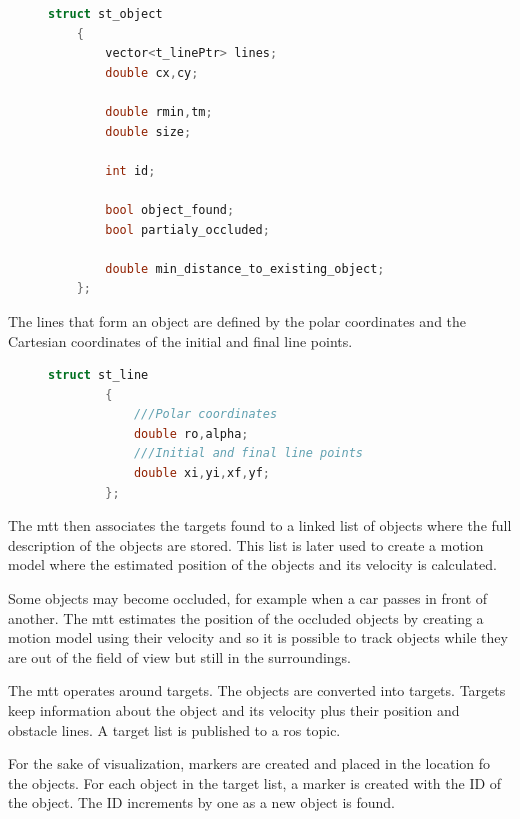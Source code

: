 \begin{figure}
\begin{center}
	\begin{lstlisting}[label={lst:stobject}, caption={st\_object struct definition},language=c++]
	struct st_object
	{
		vector<t_linePtr> lines;
		double cx,cy;
		
		double rmin,tm;
		double size;
		
		int id;
		
		bool object_found;
		bool partialy_occluded;
		
		double min_distance_to_existing_object;
	};		\end{lstlisting}
\end{center}
\end{figure}

The lines that form an object are defined by the polar coordinates and the Cartesian coordinates of the initial and final line points.

\begin{figure}
	\begin{center}
		\begin{lstlisting}[label={lst:stline}, caption={st\_line struct definition},language=c++]
		struct st_line
		{
			///Polar coordinates
			double ro,alpha;
			///Initial and final line points
			double xi,yi,xf,yf;
		};		\end{lstlisting}
	\end{center}
\end{figure}


The \gls{mtt} then associates the targets found to a linked list of objects where the full description of the objects are stored. This list is later used to create a motion model where the estimated position of the objects and its velocity is calculated. 

Some objects may become occluded, for example when a car passes in front of another. The \gls{mtt} estimates the position of the occluded objects by creating a motion model using their velocity and so it is possible to track objects while they are out of the field of view but still in the surroundings.

The \gls{mtt} operates around targets. The objects are converted into targets. Targets keep information about the object and its velocity plus their position and obstacle lines. A target list is published to a \gls{ros} topic. 

For the sake of visualization, markers are created and placed in the location fo the objects. For each object in the target list, a marker is created with the ID of the object. The ID increments by one as a new object is found. 

